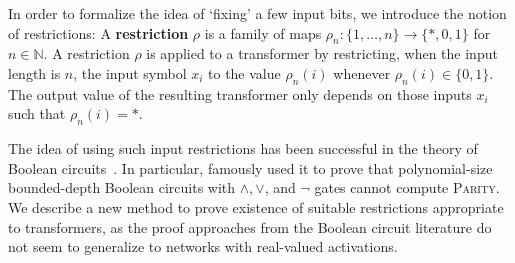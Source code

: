 \documentclass[11pt,a4paper]{article}
\newcommand{\key}[1]{\textbf{#1}}
\begin{document}
In order to formalize the idea of `fixing'  a few input bits, we introduce the notion of restrictions:
A \key{restriction} $\rho$ is a family of maps $\rho_n : \{1, \dots, n\} \rightarrow \{*, 0, 1\}$ for $n \in \mathbb{N}$.
A restriction $\rho$ is applied to a transformer by restricting, when the input length is $n$, the input symbol $x_i$ to the value $\rho_n(i)$ whenever $\rho_n(i) \in \{0, 1\}$.
The output value of the resulting transformer only depends on those inputs $x_i$ such that $\rho_n(i) = *$.

The idea of using such input restrictions has been successful in the theory of Boolean circuits~\cite{furst1984parity,hastad1994optimal}.
In particular, \citet{furst1984parity}  famously used it to prove that polynomial-size bounded-depth Boolean circuits with $\wedge, \vee$, and $\neg$ gates cannot compute \textsc{Parity}.
We describe a new method to prove existence of suitable restrictions appropriate to transformers, as the proof approaches from the Boolean circuit literature do not seem to generalize to networks with real-valued activations.
\end{document}
